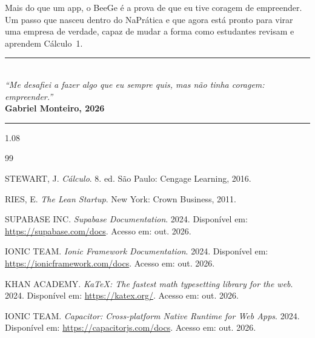 \documentclass[12pt, a4paper]{article}
\begin{document}
Mais do que um app, o BeeGe \'{e} a prova de que eu tive coragem de empreender. Um passo que nasceu dentro do NaPr\'{a}tica e que agora est\'{a} pronto para virar uma empresa de verdade, capaz de mudar a forma como estudantes revisam e aprendem C\'{a}lculo~1.

\vspace{1cm}

\begin{center}
\textcolor{beegePurple}{\rule{0.5\textwidth}{1pt}}\\[0.5cm]
\textit{``Me desafiei a fazer algo que eu sempre quis, mas n\~{a}o tinha coragem: empreender.''}\\[0.3cm]
\textbf{Gabriel Monteiro, 2026}\\[0.5cm]
\textcolor{beegePurple}{\rule{0.5\textwidth}{1pt}}
\end{center}
\newpage
{
\begin{spacing}{1.08}
\begin{thebibliography}{99}
\setlength{\itemsep}{2pt}

STEWART, J. \textit{C\'{a}lculo}. 8. ed. S\~{a}o Paulo: Cengage Learning, 2016.

RIES, E. \textit{The Lean Startup}. New York: Crown Business, 2011.

SUPABASE INC. \textit{Supabase Documentation}. 2024. Dispon\'{i}vel em: \url{https://supabase.com/docs}. Acesso em: out. 2026.

IONIC TEAM. \textit{Ionic Framework Documentation}. 2024. Dispon\'{i}vel em: \url{https://ionicframework.com/docs}. Acesso em: out. 2026.

KHAN ACADEMY. \textit{KaTeX: The fastest math typesetting library for the web}. 2024. Dispon\'{i}vel em: \url{https://katex.org/}. Acesso em: out. 2026.

IONIC TEAM. \textit{Capacitor: Cross-platform Native Runtime for Web Apps}. 2024. Dispon\'{i}vel em: \url{https://capacitorjs.com/docs}. Acesso em: out. 2026.

\end{thebibliography}
\end{spacing}
}

\vspace{0.8cm}
\appendix
\end{document}
